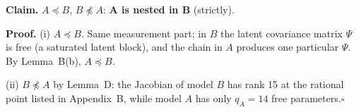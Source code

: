 \documentclass[10pt,a4paper]{article}
\newcommand{\nest}{\preceq}
\newcommand{\nnest}{\not\preceq}
\begin{document}
\par\bigskip
\noindent\textbf{Claim.} $A \nest B$, $B \nnest A$: \textbf{A is nested in B} (strictly).\par\smallskip
\noindent\textbf{Proof.} (i) $A\nest B$. Same measurement part; in $B$ the latent covariance matrix $\Psi$ is free (a saturated latent block), and the chain in $A$ produces one particular $\Psi$. By Lemma~B(b), $A\nest B$.\par\smallskip
\noindent(ii) $B\nnest A$ by Lemma~D: the Jacobian of model $B$ has rank 15 at the rational point listed in Appendix~B, while model $A$ has only $q_A=14$ free parameters.\hfill$\square$\par\medskip
{}

\clearpage
\end{document}
